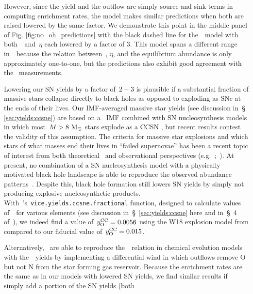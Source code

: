 \documentclass[ms.tex]{subfiles}
\begin{document}
However, since the yield and the outflow are simply source and sink terms in
computing enrichment rates, the model makes similar predictions when both are
raised lowered by the same factor.
We demonstrate this point in the middle panel of Fig.
\ref{fig:no_oh_predictions} with the black dashed line for the~\cristallo~model
with both~~and~$\eta$ each lowered by a factor of 3.
This model spans a different range in~\oh~because the relation between~,
$\eta$, and the equilibrium abundance is only approximately one-to-one, but the
predictions also exhibit good agreement with the~\citet{Dopita2016}
measurements.
\par
Lowering our SN yields by a factor of~$2 - 3$ is plausible if a substantial
fraction of massive stars collapse directly to black holes as opposed to
exploding as SNe at the ends of their lives.
Our IMF-averaged massive star yields (see discussion in~\S
\ref{sec:yields:ccsne}) are based on a~\citet{Kroupa2001} IMF combined with SN
nucleosynthesis models in which most~$M > 8~\text{M}_\odot$ stars explode as a CCSN
\cite[e.g.][]{Woosley1995, Chieffi2004, Chieffi2013, Limongi2018, Nomoto2013},
but recent results contest the validity of this assumption.
The criteria for massive star explosions and which stars of what masses end
their lives in ``failed supernovae'' has been a recent topic of interest from
both theoretical~\citep[e.g.][]{Pejcha2015, Sukhbold2016, Ertl2016} and
observational perspectives (e.g.~\citealp*{Gerke2015};~\citealp{Adams2017,
Basinger2021}).
At present, no combination of a SN nucleosynthesis model with a physically
motivated black hole landscape is able to reproduce the observed abundance
patterns~\citep{Griffith2021a}.
Despite this, black hole formation still lowers SN yields by simply not
producing explosive nucleosynthetic products.
With~\vice's~\texttt{vice.yields.ccsne.fractional} function, designed to
calculate values of~~for various elements (see discussion
in~\S~\ref{sec:yields:ccsne} here and in~\S~4 of~\citealp{Griffith2021a}), we
indeed find a value of~$y_\text{O}^\text{CC} = 0.0056$ using the W18 explosion model from
\citet{Sukhbold2016} compared to our fiducial value of~$y_\text{O}^\text{CC} = 0.015$.
\par
Alternatively,~\citet{Vincenzo2016a} are able to reproduce the~\ohno~relation
in chemical evolution models with the~\ventura~yields by implementing a
differential wind in which outflows remove O but not N from the star forming
gas reservoir.
Because the enrichment rates are the same as in our models with lowered SN
yields, we find similar results if simply add a portion of the SN yields (both
\end{document}
